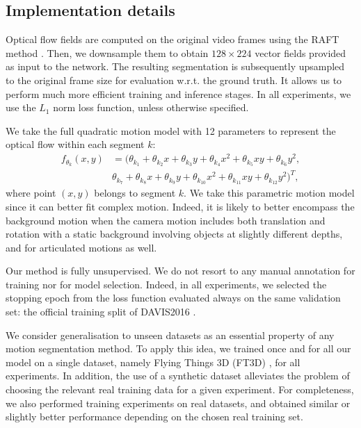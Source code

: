 \documentclass[10pt,twocolumn,letterpaper]{article}
\begin{document}
\subsection{Implementation details}
\label{implementationdetails}

Optical flow fields are computed on the original video frames using the RAFT method \cite{teed_raft_2020}. Then, we downsample them to obtain $128 \times 224$ vector fields provided as input to the network. The resulting segmentation is subsequently upsampled to the original frame size for evaluation w.r.t. the ground truth. It allows us to perform much more efficient training and inference stages. In all experiments, we use the $L_1$ norm loss function, unless otherwise specified.

We take the full quadratic motion model with 12 parameters to represent the optical flow within each segment $k$:
\begin{align}
f_{\theta_k}(x,y) &= (\theta_{k_1}+\theta_{k_2}x+\theta_{k_3}y+\theta_{k_4}x^2+\theta_{k_5}xy+\theta_{k_6}y^2,\nonumber\\
& \theta_{k_7}+\theta_{k_8}x+\theta_{k_9}y+\theta_{k_{10}}x^2+\theta_{k_{11}}xy+\theta_{k_{12}}y^2)^T,
\end{align}
where point $(x,y)$ belongs to segment $k$. We take this parametric motion model since it can better fit complex motion. {\color{black} Indeed, it is likely to better encompass} the background motion when the camera motion includes both translation and rotation with a static {\color{black} background involving objects at slightly} different depths, and for articulated motions as well.

Our method is fully unsupervised. We do not resort to any manual annotation for training nor for model selection. Indeed, in all experiments, we selected the stopping epoch from the loss function evaluated always on the same validation set: the official training split of DAVIS2016 \cite{pont-tuset_benchmark_2016}. 


We consider generalisation to unseen datasets as an essential property of any motion segmentation method. To apply this idea, we trained once and for all our model on a single dataset, namely Flying Things 3D (FT3D) \cite{ft3d2016}, for all experiments.
In addition, the use of a synthetic dataset alleviates the problem of choosing the relevant real training data for a given experiment. For completeness, we also performed training experiments on real datasets, and obtained similar or slightly better performance depending on the chosen real training set.
\end{document}
